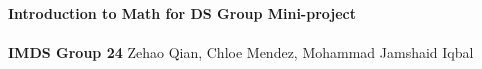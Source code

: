% 
\begin{titlepage}
    \centering
    \vspace*{\fill}
    \vspace*{1cm}
    \textbf{\fontsize{17.28}{18}\selectfont Introduction to Math for DS Group Mini-project} \\
    \vspace{0.5cm}
    \fontsize{14}{16}\selectfont{Analysis of factors affecting Premier League match results} \\
    \vspace{1.5cm}
    \textbf{IMDS Group 24}
    \vfill
    Zehao Qian, Chloe Mendez, Mohammad Jamshaid Iqbal \\
    \vspace{0.9cm}
    \vspace{0.9cm}
    \vspace{0.9cm}
    
    \vspace*{\fill}
\end{titlepage}
% 